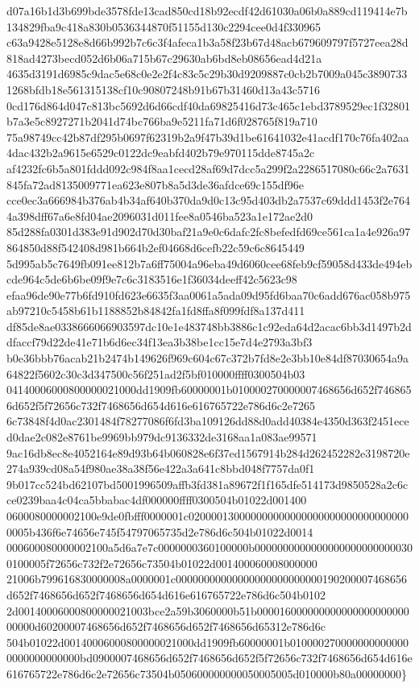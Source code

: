 d07a16b1d3b699bde3578fde13cad850cd18b92ecdf42d61030a06b0a889cd119414e7b134829fba9c418a830b0536344870f51155d130c2294cee0d4f330965
c63a9428e5128e8d66b992b7c6c3f4afeca1b3a58f23b67d48acb679609797f5727eea28d818ad4273becd052d6b06a715b67c29630ab6bd8eb08656ead4d21a
4635d3191d6985c9dac5e68c0e2e2f4c83c5c29b30d9209887c0cb2b7009a045c38907331268bfdb18e561315138cf10c90807248b91b67b31460d13a43c5716
0cd176d864d047c813bc5692d6d66cdf40da69825416d73c465c1ebd3789529ec1f32801b7a3e5c8927271b2041d74bc766ba9e5211fa71d6f028765f819a710
75a98749cc42b87df295b0697f62319b2a9f47b39d1be61641032e41acdf170c76fa402aa4dac432b2a9615e6529c0122dc9eabfd402b79e970115dde8745a2c
af4232fc6b5a801fddd092c984f8aa1cecd28af69d7dcc5a299f2a2286517080c66c2a7631845fa72ad8135009771ea623e807b8a5d3de36afdce69c155df96e
cce0ec3a666984b376ab4b34af640b370da9d0c13c95d403db2a7537c69ddd1453f2e7644a398dff67a6e8fd04ae2096031d011fee8a0546ba523a1e172ae2d0
85d288fa0301d383e91d902d70d30baf21a9e0c6dafc2fc8befedfd69ce561ca1a4e926a97864850d88f542408d981b664b2ef04668d6cefb22c59c6c8645449
5d995ab5c7649fb091ee812b7a6ff75004a96eba49d6060cee68feb9cf59058d433de494ebcde964c5de6b6be09f9e7c6c3183516e1f36034deeff42c5623c98
efaa96de90e77b6fd910fd623e6635f3aa0061a5ada09d95fd6baa70c6add676ac058b975ab97210c5458b61b1188852b84842fa1fd8ffa8f099fdf8a137d411
df85de8ae0338666066903597dc10e1e483748bb3886c1c92eda64d2acac6bb3d1497b2ddfaccf79d22de41e71b6d6ec34f13ea3b38be1cc15e7d4e2793a3bf3
b0e36bbb76acab21b2474b149626f969c604c67c372b7fd8e2e3bb10e84df87030654a9a64822f5602c30c3d347500c56f251ad2f5bf010000ffff0300504b03
04140006000800000021000dd1909fb60000001b010000270000007468656d652f7468656d652f5f72656c732f7468656d654d616e616765722e786d6c2e7265
6c73848f4d0ac2301484f78277086f6fd3ba109126dd88d0add40384e4350d363f2451eced0dae2c082e8761be9969bb979dc9136332de3168aa1a083ae99571
9ac16db8ec8e4052164e89d93b64b060828e6f37ed1567914b284d262452282e3198720e274a939cd08a54f980ae38a38f56e422a3a641c8bbd048f7757da0f1
9b017cc524bd62107bd5001996509affb3fd381a89672f1f165dfe514173d9850528a2c6cce0239baa4c04ca5bbabac4df000000ffff0300504b01022d001400
0600080000002100e9de0fbfff0000001c0200001300000000000000000000000000000000005b436f6e74656e745f54797065735d2e786d6c504b01022d0014
000600080000002100a5d6a7e7c0000000360100000b00000000000000000000000000300100005f72656c732f2e72656c73504b01022d001400060008000000
21006b799616830000008a0000001c00000000000000000000000000190200007468656d652f7468656d652f7468656d654d616e616765722e786d6c504b0102
2d00140006000800000021003bce2a59b3060000b51b00001600000000000000000000000000d60200007468656d652f7468656d652f7468656d65312e786d6c
504b01022d00140006000800000021000dd1909fb60000001b0100002700000000000000000000000000bd0900007468656d652f7468656d652f5f72656c732f7468656d654d616e616765722e786d6c2e72656c73504b050600000000050005005d010000b80a00000000\}
